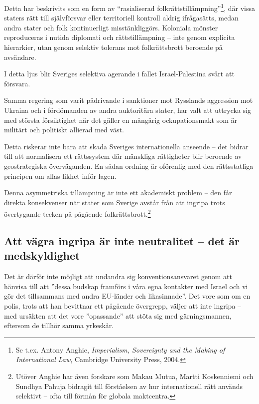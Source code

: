 Detta har beskrivits som en form av “rasialiserad folkrättstillämpning”\footnote{Se t.ex. Antony Anghie, \textit{Imperialism, Sovereignty and the Making of International Law}, Cambridge University Press, 2004.}, där vissa staters rätt till självförsvar eller territoriell kontroll aldrig ifrågasätts, medan andra stater och folk kontinuerligt misstänkliggörs. Koloniala mönster reproduceras i nutida diplomati och rättstillämpning – inte genom explicita hierarkier, utan genom selektiv tolerans mot folkrättsbrott beroende på avsändare.

I detta ljus blir Sveriges selektiva agerande i fallet Israel-Palestina svårt att försvara.

Samma regering som varit pådrivande i sanktioner mot Rysslands aggression mot Ukraina och i fördömanden av andra auktoritära stater, har valt att uttrycka sig med största försiktighet när det gäller en mångårig ockupationsmakt som är militärt och politiskt allierad med väst. 

Detta riskerar inte bara att skada Sveriges internationella anseende – det bidrar till att normalisera ett rättssystem där mänskliga rättigheter blir beroende av geostrategiska överväganden. En sådan ordning är oförenlig med den rättsstatliga principen om allas likhet inför lagen.



\vspace{1em}

Denna asymmetriska tillämpning är inte ett akademiskt problem – den får direkta konsekvenser när stater som Sverige avstår från att ingripa trots övertygande tecken på pågående folkrättsbrott.\footnote{Utöver Anghie har även forskare som Makau Mutua, Martti Koskenniemi och Sundhya Pahuja bidragit till förståelsen av hur internationell rätt används selektivt – ofta till förmån för globala maktcentra.}





\subsection*{Att vägra ingripa är inte neutralitet – det är medskyldighet}

Det är därför inte möjligt att undandra sig konventionsansvaret genom att hänvisa till att ”dessa budskap framförs i våra egna kontakter med Israel och vi gör det tillsammans med andra EU-länder och likasinnade”.  
Det vore som om en polis, trots att han bevittnar ett pågående övergrepp, väljer att inte ingripa – med ursäkten att det vore ”opassande” att stöta sig med gärningsmannen, eftersom de tillhör samma yrkeskår.

